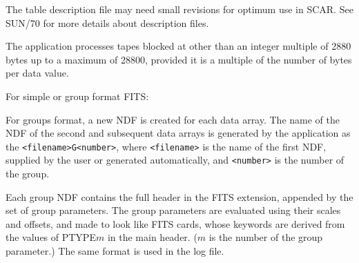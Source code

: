 {{{{         \sstitem
         The table description file may need small revisions for optimum
         use in SCAR.  See SUN/70 for more details about description files.

         \sstitem
         The application processes tapes blocked at other than an
         integer multiple of 2880 bytes up to a maximum of 28800, provided
         it is a multiple of the number of bytes per data value.

         \sstitem
         For simple or group format FITS:


         \sstitem
         For groups format, a new NDF is created for each data array.
         The name of the NDF of the second and subsequent data arrays is
         generated by the application as the {\tt <filename>G<number>}, where
         {\tt <filename>} is the name of the first NDF, supplied by the user or
         generated automatically, and {\tt <number>} is the number of the group.

         Each group NDF contains the full header in the FITS extension,
         appended by the set of group parameters.  The group parameters
         are evaluated using their scales and offsets, and made to look
         like FITS cards, whose keywords are derived from the values of
         PTYPE$m$ in the main header.  ($m$ is the number of the group
         parameter.) The same format is used in the log file.

}}}}
